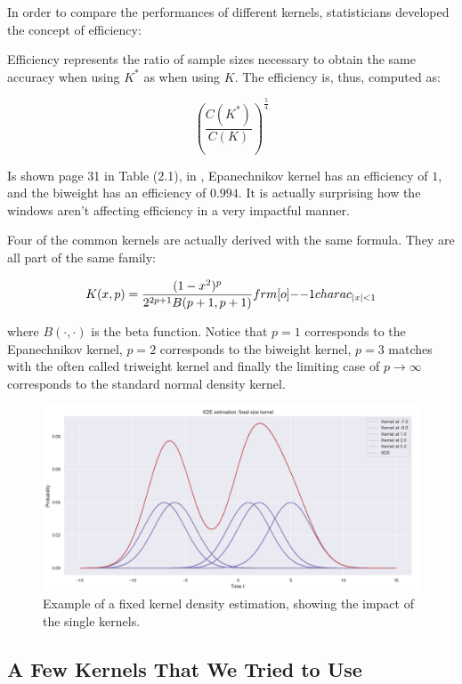 In order to compare the performances of different kernels, statisticians developed the concept of efficiency:

\begin{definition}
Efficiency represents the ratio of sample sizes necessary
to obtain the same accuracy when using $K^*$ as when using $K$. The efficiency is, thus, computed as:

$$ \left ( \frac{C(K^*)}{C(K)} \right ) ^{\frac 5 4 } $$
\end{definition}

Is shown page 31 in Table (2.1), in \cite{Wand}, Epanechnikov kernel has an efficiency of $1$, and the biweight has an efficiency of $0.994$. It is actually surprising how the windows aren't affecting efficiency in a very impactful manner.



\begin{remarque}
Four of the common kernels are actually derived with the same formula. They are all part of the same family:

$$ K(x,p) = \frac{(1-x^2)^p}{2^{2p+1} B(p+1,p+1) } \11charac_{\abs x < 1 }$$

where $B(\cdot, \cdot)$ is the beta function. Notice that $p=1$ corresponds to the Epanechnikov kernel, $p=2$ corresponds to the biweight kernel, $p=3$ matches with the often called triweight kernel and finally the limiting case of $p \to \infty$ corresponds to the standard normal density kernel. 
\end{remarque}


\begin{figure}
\centering
\includegraphics[width = 0.90 \textwidth]{../imag/chap3/FKDE.png}
\caption{Example of a fixed kernel density estimation, showing the impact of the single kernels.}
\label{fig:FKDE}
\end{figure}

\subsection{A Few Kernels That We Tried to Use}
\label{section_few_trials_kernels}


